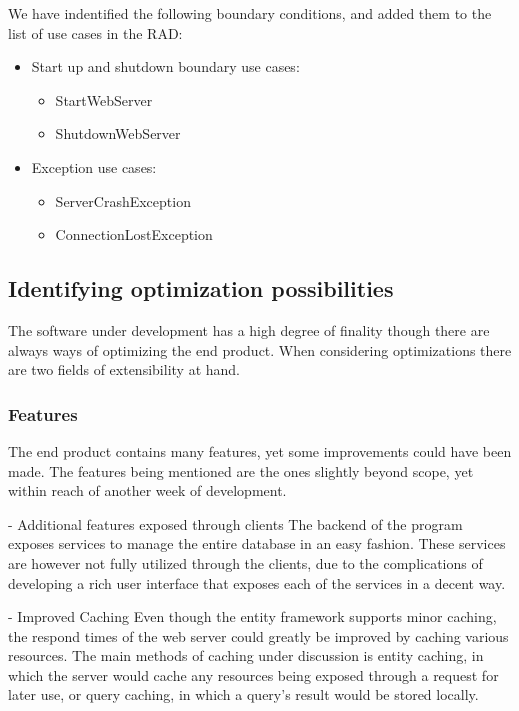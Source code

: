 We have indentified the following boundary conditions, and added them to the list of use cases in the RAD:

\begin{itemize}
	\item Start up and shutdown boundary use cases:
	\begin{itemize}
			\item StartWebServer
			\item ShutdownWebServer
	\end{itemize}
	\item Exception use cases:
	\begin{itemize}
			\item ServerCrashException
			\item ConnectionLostException
	\end{itemize}
\end{itemize}

\subsection{Identifying optimization possibilities}

The software under development has a high degree of finality though there are always ways of optimizing the end product.
When considering optimizations there are two fields of extensibility at hand.

\subsubsection{Features}

The end product contains many features, yet some improvements could have been made.
The features being mentioned are the ones slightly beyond scope, yet within reach of another week of development.

- Additional features exposed through clients
The backend of the program exposes services to manage the entire database in an easy fashion. These services are however not fully utilized through the clients, due to the complications of developing a rich user interface that exposes each of the services in a decent way.

- Improved Caching
Even though the entity framework supports minor caching, the respond times of the web server could greatly be improved by caching various resources.
The main methods of caching under discussion is entity caching, in which the server would cache any resources being exposed through a request for later use, or query caching, in which a query's result would be stored locally.

